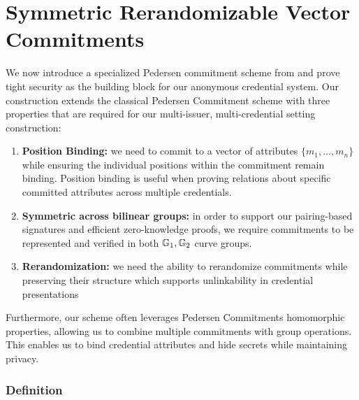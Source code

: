 \section{Symmetric Rerandomizable Vector Commitments}\label{sec:commitment}
We now introduce a specialized Pedersen commitment scheme from \cite{tomescu2022utt} and prove tight security as the building block for our anonymous credential system. Our construction extends the classical Pedersen Commitment scheme with three properties that are required for our multi-issuer, multi-credential setting construction:
\begin{enumerate}
    \item \textbf{Position Binding: } we need to commit to a vector of attributes $\{m_1, \ldots, m_n\}$ while ensuring the individual positions within the commitment remain binding. Position binding is useful when proving relations about specific committed attributes across multiple credentials. 
    
    \item \textbf{Symmetric across bilinear groups: } in order to support our pairing-based signatures and efficient zero-knowledge proofs, we require commitments to be represented and verified in both $\mathbb{G}_1, \mathbb{G}_2$ curve groups. 
    
    \item \textbf{Rerandomization: } we need the ability to rerandomize commitments while preserving their structure which supports unlinkability in credential presentations
\end{enumerate}

\noindent Furthermore, our scheme often leverages Pedersen Commitments homomorphic properties, allowing us to combine multiple commitments with group operations. This enables us to bind credential attributes and hide secrets while maintaining privacy. 

\subsubsection{Definition}

